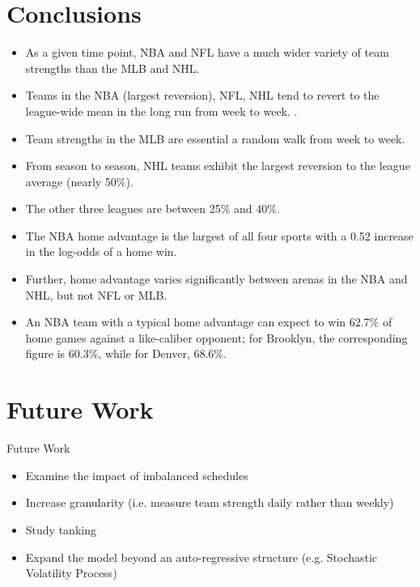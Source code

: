 \documentclass{beamer}\usepackage[]{graphicx}\usepackage[]{color}
\begin{document}
\section{Conclusions}
\begin{frame}
\begin{itemize}
\item As a given time point, NBA and NFL have a much wider variety of team strengths than the MLB and NHL.  
\item Teams in the NBA (largest reversion), NFL, NHL tend to revert to the league-wide mean in the long run from week to week. .
\item Team strengths in the MLB are essential a random walk from week to week.  
\item From season to season, NHL teams exhibit the largest reversion to the league average (nearly 50\%).
\item The other three leagues are between 25\% and 40\%.  
\end{itemize}
\end{frame}

\begin{frame}
\begin{itemize}
\item The NBA home advantage is the largest of all four sports with a 0.52 increase in the log-odds of a home win.  
\item Further, home advantage varies significantly between arenas in the NBA and NHL, but not NFL or MLB.  
\item An NBA team with a typical home advantage can expect to win 62.7\% of home games against a like-caliber opponent; for Brooklyn, the corresponding figure is 60.3\%, while for Denver, 68.6\%.
\end{itemize}
\end{frame}



\section{Future Work}
\begin{frame}{Future Work}
\begin{itemize}
\item Examine the impact of imbalanced schedules
\item Increase granularity (i.e. measure team strength daily rather than weekly)
\item Study tanking
\item Expand the model beyond an auto-regressive structure (e.g. Stochastic Volatility Process)
\end{itemize}
\end{frame}
\end{document}
